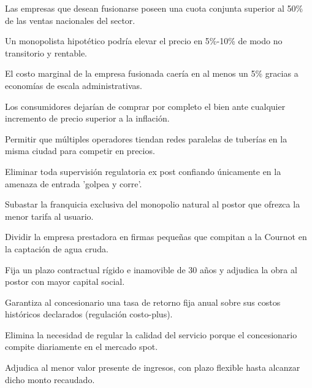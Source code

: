 \begin{opts}
    \item Las empresas que desean fusionarse poseen una cuota conjunta superior al 50\% de las ventas nacionales del sector.
    \item Un monopolista hipotético podría elevar el precio en 5\%-10\% de modo no transitorio y rentable.
    \item El costo marginal de la empresa fusionada caería en al menos un 5\% gracias a economías de escala administrativas.
    \item Los consumidores dejarían de comprar por completo el bien ante cualquier incremento de precio superior a la inflación.
\end{opts}

\begin{opts}
    \item Permitir que múltiples operadores tiendan redes paralelas de tuberías en la misma ciudad para competir en precios.
    \item Eliminar toda supervisión regulatoria ex post confiando únicamente en la amenaza de entrada 'golpea y corre'.
    \item Subastar la franquicia exclusiva del monopolio natural al postor que ofrezca la menor tarifa al usuario.
    \item Dividir la empresa prestadora en firmas pequeñas que compitan a la Cournot en la captación de agua cruda.
\end{opts}

\begin{opts}
    \item Fija un plazo contractual rígido e inamovible de 30 años y adjudica la obra al postor con mayor capital social.
    \item Garantiza al concesionario una tasa de retorno fija anual sobre sus costos históricos declarados (regulación costo-plus).
    \item Elimina la necesidad de regular la calidad del servicio porque el concesionario compite diariamente en el mercado spot.
    \item Adjudica al menor valor presente de ingresos, con plazo flexible hasta alcanzar dicho monto recaudado.
\end{opts}

